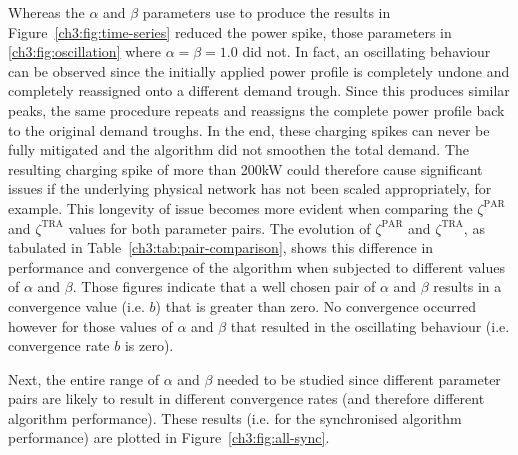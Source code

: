 

Whereas the $\alpha$ and $\beta$ parameters use to produce the results in Figure~\ref{ch3:fig:time-series} reduced the power spike, those parameters in \ref{ch3:fig:oscillation} where $\alpha = \beta = 1.0$ did not.
In fact, an oscillating behaviour can be observed since the initially applied power profile is completely undone and completely reassigned onto a different demand trough.
Since this produces similar peaks, the same procedure repeats and reassigns the complete power profile back to the original demand troughs.
In the end, these charging spikes can never be fully mitigated and the algorithm did not smoothen the total demand.
The resulting charging spike of more than 200kW could therefore cause significant issues if the underlying physical network has not been scaled appropriately, for example.
This longevity of issue becomes more evident when comparing the $\zeta^\text{PAR}$ and $\zeta^\text{TRA}$ values for both parameter pairs.
The evolution of $\zeta^\text{PAR}$ and $\zeta^\text{TRA}$, as tabulated in Table~\ref{ch3:tab:pair-comparison}, shows this difference in performance and convergence of the algorithm when subjected to different values of $\alpha$ and $\beta$.
Those figures indicate that a well chosen pair of $\alpha$ and $\beta$ results in a convergence value (i.e. $b$) that is greater than zero.
No convergence occurred however for those values of $\alpha$ and $\beta$ that resulted in the oscillating behaviour (i.e. convergence rate $b$ is zero).

Next, the entire range of $\alpha$ and $\beta$ needed to be studied since different parameter pairs are likely to result in different convergence rates (and therefore different algorithm performance).
These results (i.e. for the synchronised algorithm performance) are plotted in Figure~\ref{ch3:fig:all-sync}.



